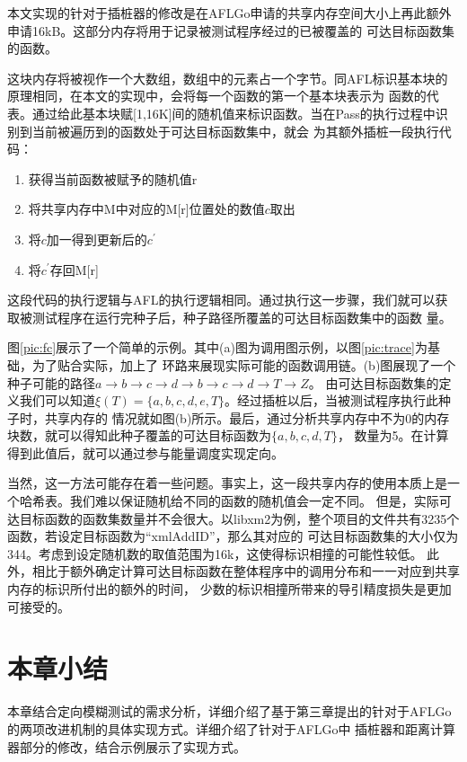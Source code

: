 \documentclass[bachelor]{njupthesis}
\begin{document}
本文实现的针对于插桩器的修改是在AFLGo申请的共享内存空间大小上再此额外申请16kB。这部分内存将用于记录被测试程序经过的已被覆盖的
可达目标函数集的函数。

这块内存将被视作一个大数组，数组中的元素占一个字节。同AFL标识基本块的原理相同，在本文的实现中，会将每一个函数的第一个基本块表示为
函数的代表。通过给此基本块赋[1,16K]间的随机值来标识函数。当在Pass的执行过程中识别到当前被遍历到的函数处于可达目标函数集中，就会
为其额外插桩一段执行代码：

\begin{enumerate}[label=(\arabic*)]
	\item 获得当前函数被赋予的随机值r
	\item 将共享内存中M中对应的M[r]位置处的数值$c$取出
	\item 将$c$加一得到更新后的$c^\prime$
	\item 将$c^\prime$存回M[r] 
\end{enumerate}

这段代码的执行逻辑与AFL的执行逻辑相同。通过执行这一步骤，我们就可以获取被测试程序在运行完种子后，种子路径所覆盖的可达目标函数集中的函数
量。

图\ref{pic:fc}展示了一个简单的示例。其中(a)图为调用图示例，以图\ref{pic:trace}为基础，为了贴合实际，加上了
环路来展现实际可能的函数调用链。(b)图展现了一个种子可能的路径$a\to b \to c \to d \to b \to c \to d \to T \to Z$。
由可达目标函数集的定义我们可以知道$\xi(T)=\{a,b,c,d,e,T\}$。经过插桩以后，当被测试程序执行此种子时，共享内存的
情况就如图(b)所示。最后，通过分析共享内存中不为0的内存块数，就可以得知此种子覆盖的可达目标函数为$\{a,b,c,d,T\}$，
数量为5。在计算得到此值后，就可以通过参与能量调度实现定向。

当然，这一方法可能存在着一些问题。事实上，这一段共享内存的使用本质上是一个哈希表。我们难以保证随机给不同的函数的随机值会一定不同。
但是，实际可达目标函数的函数集数量并不会很大。以libxm2为例，整个项目的文件共有3235个函数，若设定目标函数为“xmlAddID”，那么其对应的
可达目标函数集的大小仅为344。考虑到设定随机数的取值范围为16k，这使得标识相撞的可能性较低。
此外，相比于额外确定计算可达目标函数在整体程序中的调用分布和一一对应到共享内存的标识所付出的额外的时间，
少数的标识相撞所带来的导引精度损失是更加可接受的。

\section{本章小结}
本章结合定向模糊测试的需求分析，详细介绍了基于第三章提出的针对于AFLGo的两项改进机制的具体实现方式。详细介绍了针对于AFLGo中
插桩器和距离计算器部分的修改，结合示例展示了实现方式。
\end{document}
